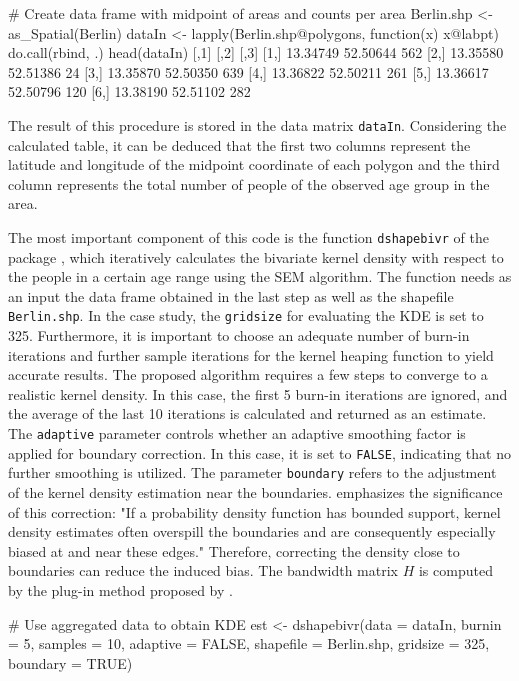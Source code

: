 \begin{example}
    # Create data frame with midpoint of areas and counts per area
    Berlin.shp <- as_Spatial(Berlin)
    dataIn <- lapply(Berlin.shp@polygons, function(x) x@labpt) %
      do.call(rbind, .) %
    head(dataIn)
             [,1]     [,2] [,3]
    [1,] 13.34749 52.50644  562
    [2,] 13.35580 52.51386   24
    [3,] 13.35870 52.50350  639
    [4,] 13.36822 52.50211  261
    [5,] 13.36617 52.50796  120
    [6,] 13.38190 52.51102  282
\end{example}

The result of this procedure is stored in the data matrix \texttt{dataIn}. Considering the calculated table, it can be deduced that the first two columns represent the latitude and longitude of the midpoint coordinate of each polygon and the third column represents the total number of people of the observed age group in the area. 

The most important component of this code is the function \texttt{dshapebivr} of the package \hyperlink{https://cran.r-project.org/web/packages/Kernelheaping/index.html}{}, which iteratively calculates the bivariate kernel density with respect to the people in a certain age range using the SEM algorithm. 
The function needs as an input the data frame obtained in the last step as well as the shapefile \texttt{Berlin.shp}.
In the case study, the \texttt{gridsize} for evaluating the KDE is set to 325.
Furthermore, it is important to choose an adequate number of burn-in iterations and further sample iterations for the kernel heaping function to yield accurate results. The proposed algorithm requires a few steps to converge to a realistic kernel density. 
In this case, the first 5 burn-in iterations are ignored, and the average of the last 10 iterations is calculated and returned as an estimate.
The \texttt{adaptive} parameter controls whether an adaptive smoothing factor is applied for boundary correction. 
In this case, it is set to \texttt{FALSE}, indicating that no further smoothing is utilized. 
The parameter \texttt{boundary} refers to the adjustment of the kernel density estimation near the boundaries. \cite{Jones1993} emphasizes the significance of this correction: "If a probability density function has bounded support, kernel density estimates often overspill the boundaries and are consequently especially biased at and near these edges." Therefore, correcting the density close to boundaries can reduce the induced bias. The bandwidth matrix $H$ is computed by the plug-in method proposed by \cite{Wand94}. 
\begin{example}
    # Use aggregated data to obtain KDE 
    est <- dshapebivr(data = dataIn, burnin = 5, samples = 10, 
                      adaptive = FALSE, shapefile = Berlin.shp, 
                      gridsize = 325, boundary = TRUE)
\end{example}

